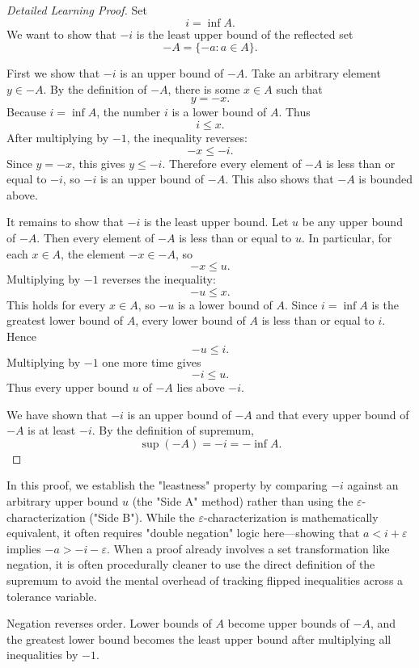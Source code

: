 \begin{proof}[Detailed Learning Proof]
\LRAProofBodyStart
Set
\[
i=\inf A.
\]
We want to show that \(-i\) is the least upper bound of the reflected set
\[
-A=\{-a:a\in A\}.
\]

First we show that \(-i\) is an upper bound of \(-A\). Take an arbitrary
element \(y\in -A\). By the definition of \(-A\), there is some \(x\in A\)
such that
\[
y=-x.
\]
Because \(i=\inf A\), the number \(i\) is a lower bound of \(A\). Thus
\[
i\le x.
\]
After multiplying by \(-1\), the inequality reverses:
\[
-x\le -i.
\]
Since \(y=-x\), this gives \(y\le -i\). Therefore every element of \(-A\) is
less than or equal to \(-i\), so \(-i\) is an upper bound of \(-A\). This also
shows that \(-A\) is bounded above.

It remains to show that \(-i\) is the least upper bound. Let \(u\) be any
upper bound of \(-A\). Then every element of \(-A\) is less than or equal to
\(u\). In particular, for each \(x\in A\), the element \(-x\in -A\), so
\[
-x\le u.
\]
Multiplying by \(-1\) reverses the inequality:
\[
-u\le x.
\]
This holds for every \(x\in A\), so \(-u\) is a lower bound of \(A\). Since
\(i=\inf A\) is the greatest lower bound of \(A\), every lower bound of \(A\)
is less than or equal to \(i\). Hence
\[
-u\le i.
\]
Multiplying by \(-1\) one more time gives
\[
-i\le u.
\]
Thus every upper bound \(u\) of \(-A\) lies above \(-i\).

We have shown that \(-i\) is an upper bound of \(-A\) and that every upper
bound of \(-A\) is at least \(-i\). By the definition of supremum,
\[
\sup(-A)=-i=-\inf A.
\]
\end{proof}

\begin{remark*}
In this proof, we establish the "leastness" property by comparing $-i$ against an arbitrary upper bound $u$ (the "Side A" method) rather than using the $\varepsilon$-characterization ("Side B"). While the $\varepsilon$-characterization is mathematically equivalent, it often requires "double negation" logic here---showing that $a < i + \varepsilon$ implies $-a > -i - \varepsilon$. When a proof already involves a set transformation like negation, it is often procedurally cleaner to use the direct definition of the supremum to avoid the mental overhead of tracking flipped inequalities across a tolerance variable.
\end{remark*}

\begin{remark*}
Negation reverses order. Lower bounds of \(A\) become upper bounds of \(-A\),
and the greatest lower bound becomes the least upper bound after multiplying
all inequalities by \(-1\).
\end{remark*}

